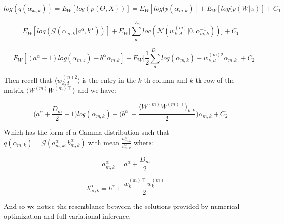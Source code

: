\documentclass{article}
\begin{document}
$$log(q(\alpha_{m,k})) = E_{W}[log(p(\Theta,X))] = E_{W}[log(p(\alpha_{m,k})] + E_{W}[log(p(W|\alpha)] + C_1$$

$$ = E_{W}[log(\mathcal{G}(\alpha_{m,k}|a^\alpha,b^\alpha))] +  E_{W}\bigg[\sum_{d}^{D_m}{log(\mathcal{N}(w_{k,d}^{(m)}|0, \alpha_{m,k}^{-1}))}\bigg]+C_1$$

$$= E_W[(a^\alpha-1)log(\alpha_{m,k}) - b^\alpha\alpha_{m,k}] + E_W\bigg[\frac{1}{2}\sum_d^{D_m}{log(\alpha_{m,k}) - w_{k,d}^{(m)2} \alpha_{m,k} }\bigg] + C_2$$

Then recall that $\langle w_{k,d}^{(m)2}\rangle$ is the entry in the $k$-th column and $k$-th row of the matrix $\langle W^{(m)}W^{(m)\intercal}\rangle$ and we have:

$$= \bigg(a^\alpha+\frac{D_m}{2}-1 \bigg)log(\alpha_{m,k}) - \bigg(b^\alpha\ + \frac{\langle W^{(m)}W^{(m)\intercal}\rangle_{k,k}}{2} \bigg) \alpha_{m,k} + C_2$$

Which has the form of a Gamma distribution such that $q(\alpha_{m,k}) = \mathcal{G}(a_{m,k}^\alpha, b_{m,k}^\alpha)$ with mean $\frac{a_{m,k}^\alpha}{b_{m,k}^\alpha}$ where:

$$a_{m,k}^\alpha = a^\alpha+\frac{D_m}{2}$$

$$b_{m,k}^\alpha = b^\alpha + \frac{w_k^{(m)\intercal}w_k^{(m)}}{2}$$

And so we notice the resemblance between the solutions provided by numerical optimization and full variational inference.
\end{document}
